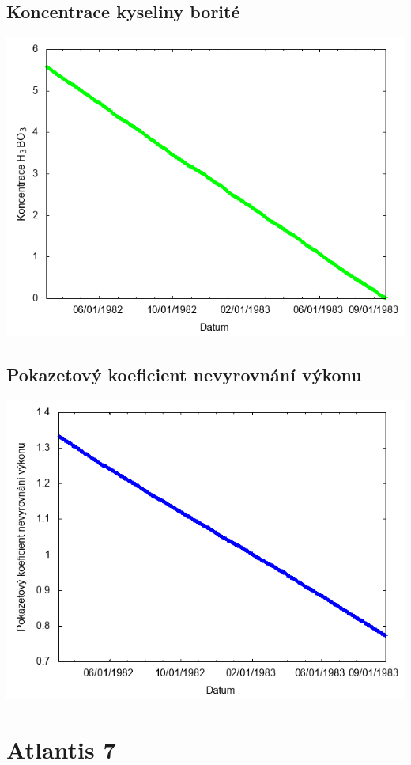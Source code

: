 \documentclass[a4paper,twoside,11pt]{article}
\begin{document}
\subsection*{Koncentrace kyseliny borité}
\begin{center}
\includegraphics[width=.8\textwidth]{graphs/Atlantis_06_bc.png}
\end{center}

\subsection*{Pokazetový koeficient nevyrovnání výkonu}
\begin{center}
\includegraphics[width=.8\textwidth]{graphs/Atlantis_06_fha.png}
\end{center}

\newpage
\section*{Atlantis 7}
\end{document}
